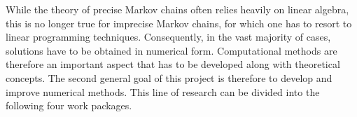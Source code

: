 \documentclass[11pt,dvipsnames,usenames,a4paper]{article}
\begin{document}
While the theory of precise Markov chains often relies heavily on linear algebra, this is no longer true for imprecise Markov chains, for which one has to resort to linear programming techniques. Consequently, in the vast majority of cases, solutions have to be obtained in numerical form.
Computational methods are therefore an important aspect that has to be developed along with theoretical concepts. 
The second general goal of this project is therefore to develop and improve numerical methods. This line of research can be divided into the following four work packages.




\end{document}
